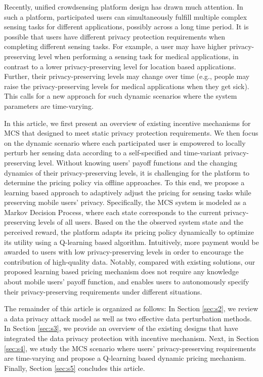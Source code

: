 Recently, unified crowdsensing platform design has drawn much attention. In such a platform, participated users can simultaneously fulfill multiple complex sensing tasks for different applications, possibly across a long time period. It is possible that users have different privacy protection requirements when completing different sensing tasks. For example, a user may have higher privacy-preserving level when performing a sensing task for medical applications, in contrast to a lower privacy-preserving level for location based applications. Further, their privacy-preserving levels may change over time (e.g., people may raise the privacy-preserving levels for medical applications when they get sick). This calls for a new approach for such dynamic scenarios where the system parameters are time-varying. 

In this article, we first present an overview of existing incentive mechanisms for MCS that designed to meet static privacy protection requirements. We then focus on the dynamic scenario where each participated user is empowered to locally perturb her sensing data according to a self-specified and time-variant privacy-preserving level. Without knowing users' payoff functions and the changing dynamics of their privacy-preserving levels, it is challenging for the platform to determine the pricing policy via offline approaches. To this end, we propose a learning based approach to adaptively adjust the pricing for sensing tasks while preserving mobile users' privacy. Specifically, the MCS system is modeled as a Markov Decision Process, where each state corresponds to the current privacy-preserving levels of all users. Based on the the observed system state and the perceived reward, the platform adapts its pricing policy dynamically to optimize its utility using a Q-learning based algorithm\cite{Sutton98a}. Intuitively, more payment would be awarded to users with low privacy-preserving levels in order to encourage the contribution of high-quality data. Notably, compared with existing solutions, our proposed learning based pricing mechanism does not require any knowledge about mobile users' payoff function, and enables users to autonomously specify their privacy-preserving requirements under different situations. 

The remainder of this article is organized as follows: In Section \ref{sec:s2}, we review a data privacy attack model as well as two effective data perturbation methods. In Section \ref{sec:s3}, we provide an overview of the existing designs that have integrated the data privacy protection with incentive mechanism. Next, in Section \ref{sec:s4}, we study the MCS scenario where users' privacy-preserving requirements are time-varying and propose a Q-learning based dynamic pricing mechanism. Finally, Section \ref{sec:s5} concludes this article.

